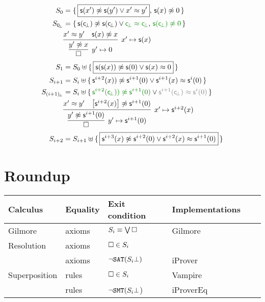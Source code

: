 \begin{align*}
S_0 &= \{\, \boxed{\msucc(x') \mNE \msucc (y') \lor x' \mEQ y'}, \, \msucc(x)\mNE 0 \, \} 
\\
S_{0\!_\bot} &= \{\, \msucc(\consbot) \mNE \msucc (\consbot) \lor{\colHi\consbot \mEQ \consbot}, \, {\colHi \msucc(\consbot)\mNE 0} \, \}
\\
&\infer[x'\mapsto \msucc(x)
]{ 
	\infer[y'\mapsto 0]{\emptyclause}{ y'\mNE x }
}
{x' \mEQ y' & \msucc(x)\mNE x}
\\
S_1 &= S_0\disjointunion \{\,
\boxed{\msucc(\msucc(x)) \mNE \msucc(0) \lor \msucc(x) \mEQ 0} \,
\} 
\\
S_{i+1} &= S_i\disjointunion \{\,
\msucc^{i+2}(x)) \mNE \msucc^{i+1} (0) \lor \msucc^{i+1}(x) \mEQ \msucc^i(0) \,
\} 
\\
S_{(i+1)\!_\bot} &= S_i\disjointunion \{\,
{\colHi \msucc^{i+2}(\consbot)) \mNE \msucc^{i+1} (0)} \lor {\colG\msucc^{i+1}(\consbot) \mEQ \msucc^i(0)} \,
\} 
\\
&\infer[x'\mapsto \msucc^{i+2}(x)
]{ 
	\infer[y'\mapsto \msucc^{i+1}(0)]{\emptyclause}{ y'\mNE \msucc^{i+1}(0) }
}
{x' \mEQ y' & \left[\msucc^{i+2}(x)\right]\mNE \msucc^{i+1}(0)}
\\
S_{i+2} &= S_{i+1}\disjointunion \{\,
\boxed{\msucc^{i+3}(x) \mNE \msucc^{i+2}(0) \lor \msucc^{i+2}(x) \mEQ \msucc^{i+1}(0)} \,
\} 
\end{align*}

\section{Roundup}

\begin{tabular}{llllll}
	Calculus & Equality & Exit condition & Implementations\\
	\hline
	Gilmore & axioms & $S_i \equiv \bigvee\square$  & Gilmore\\
	Resolution & axioms & $\square\in S_i$\\
	\InstGen & axioms & $\lnot\texttt{SAT}(S_i\bot)$ & iProver\\
	Superposition & rules & $\square\in S_i$ & Vampire \\
	\InstGenEQ & rules & $\lnot\texttt{SMT}(S_i\bot$) & iProverEq
\end{tabular}





